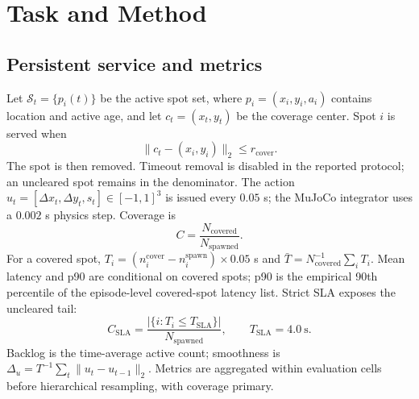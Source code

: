 \documentclass[conference]{IEEEtran}
\begin{document}
\section{Task and Method}
\subsection{Persistent service and metrics}
Let $\mathcal S_t=\{p_i(t)\}$ be the active spot set, where
$p_i=(x_i,y_i,a_i)$ contains location and active age, and let
$c_t=(x_t,y_t)$ be the coverage center. Spot $i$ is served when
\begin{equation}
\|c_t-(x_i,y_i)\|_2\le r_{\mathrm{cover}}.
\end{equation}
The spot is then removed. Timeout removal is disabled in the reported
protocol; an uncleared spot remains in the denominator. The action
$u_t=[\Delta x_t,\Delta y_t,s_t]\in[-1,1]^3$ is issued every $0.05$ s; the
MuJoCo integrator uses a $0.002$ s physics step.
Coverage is
\begin{equation}
C=\frac{N_{\mathrm{covered}}}{N_{\mathrm{spawned}}}.
\end{equation}
For a covered spot, $T_i=(n_i^{\mathrm{cover}}-n_i^{\mathrm{spawn}})
\times0.05$ s and $\bar T=N_{\mathrm{covered}}^{-1}\sum_iT_i$. Mean latency
and p90 are conditional on covered spots; p90 is the empirical 90th
percentile of the episode-level covered-spot latency list. Strict SLA exposes
the uncleared tail:
\begin{equation}
C_{\mathrm{SLA}}=\frac{|\{i:T_i\leq T_{\mathrm{SLA}}\}|}{N_{\mathrm{spawned}}},
\qquad T_{\mathrm{SLA}}=4.0\ \mathrm{s}.
\end{equation}
Backlog is the time-average active count; smoothness is
$\Delta_u=T^{-1}\sum_t\|u_t-u_{t-1}\|_2$. Metrics are aggregated within
evaluation cells before hierarchical resampling, with coverage primary.
\end{document}
